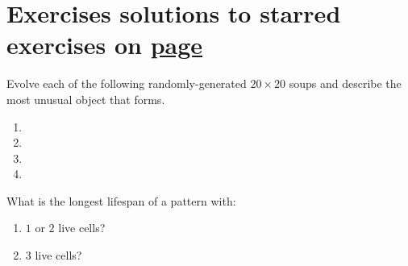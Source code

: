 \section*{Exercises \hfill \normalfont\textsf{\small solutions to starred exercises on \hyperlink{solutions_early_life}{page \pageref{solutions_early_life}}}}
\label{sec:early_life_exercises}
\vspace*{-0.4cm}\hrulefill\vspace*{-0.3cm}\footnotesize\begin{multicols}{2}\vspace*{-0.4cm}\raggedcolumns{}
\setlength{\parskip}{0pt}

\begin{problemstar}\label{exer:natural_switch_engine}
	Evolve each of the following randomly-generated $20 \times 20$ soups and describe the most unusual object that forms.\vspace*{-0.25cm}
	
	\begin{multicols}{2}
		\begin{enumerate}
			\item[\bf\color{ocre}(a)] 
			
			\item[\bf\color{ocre}(c)] 
			
			\item[\bf\color{ocre}(b)] 
			
			\item[\bf\color{ocre}(d)] 
		\end{enumerate}
	\end{multicols}
\end{problemstar}


\mfilbreak


\begin{problem}\label{exer:4_cell_methuselahs}
What is the longest lifespan of a pattern with:\smallskip

\begin{enumerate}[label=\bf\color{ocre}(\alph*)]
	\item $1$ or $2$ live cells?
	
	\item $3$ live cells?
	

\end{enumerate}
\end{problem}
\end{multicols}
